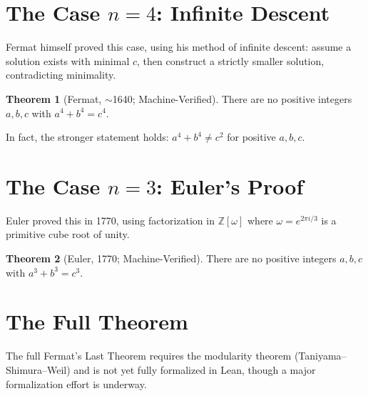 \documentclass[11pt,twoside,openright]{book}
\theoremstyle{definition}
\newtheorem{theorem}{Theorem}[chapter]
\newcommand{\Z}{\mathbb{Z}}
\begin{document}
\section{The Case $n = 4$: Infinite Descent}

Fermat himself proved this case, using his method of infinite descent:
assume a solution exists with minimal $c$, then construct a strictly
smaller solution, contradicting minimality.

\begin{theorem}[Fermat, $\sim$1640; Machine-Verified]
There are no positive integers $a, b, c$ with $a^4 + b^4 = c^4$.

In fact, the stronger statement holds: $a^4 + b^4 \neq c^2$ for
positive $a, b, c$.
\end{theorem}

\section{The Case $n = 3$: Euler's Proof}

Euler proved this in 1770, using factorization in $\Z[\omega]$ where
$\omega = e^{2\pi i/3}$ is a primitive cube root of unity.

\begin{theorem}[Euler, 1770; Machine-Verified]
There are no positive integers $a, b, c$ with $a^3 + b^3 = c^3$.
\end{theorem}

\section{The Full Theorem}

The full Fermat's Last Theorem requires the modularity theorem
(Taniyama--Shimura--Weil) and is not yet fully formalized in Lean,
though a major formalization effort is underway.

\begin{center}
\end{center}
\end{document}
